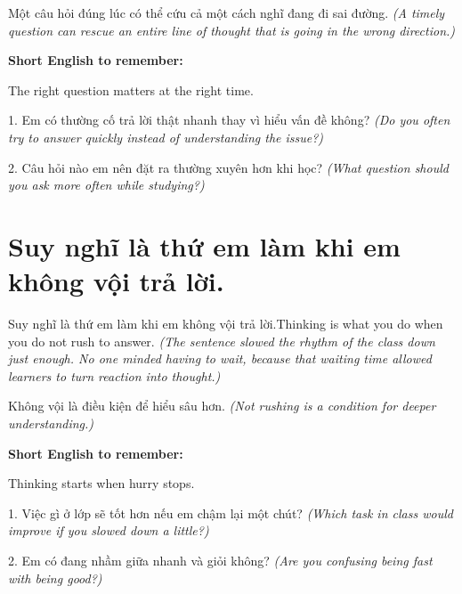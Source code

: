 \begin{baihoc}
Một câu hỏi đúng lúc có thể cứu cả một cách nghĩ đang đi sai đường.
\textit{(A timely question can rescue an entire line of thought that is going in the wrong direction.)}
\end{baihoc}

\begin{ghinhoanh}
\textbf{Short English to remember:}

The right question matters at the right time.

\end{ghinhoanh}

\begin{tuhocnhanh}
1. Em có thường cố trả lời thật nhanh thay vì hiểu vấn đề không? \textit{(Do you often try to answer quickly instead of understanding the issue?)}

2. Câu hỏi nào em nên đặt ra thường xuyên hơn khi học? \textit{(What question should you ask more often while studying?)}
\end{tuhocnhanh}
\ngancach


\section{Suy nghĩ là thứ em làm khi em không vội trả lời.}
\begin{truyen}{Suy nghĩ là thứ em làm khi em không vội trả lời.}{Thinking is what you do when you do not rush to answer.}
\textit{(The sentence slowed the rhythm of the class down just enough. No one minded having to wait, because that waiting time allowed learners to turn reaction into thought.)}
\end{truyen}

\begin{baihoc}
Không vội là điều kiện để hiểu sâu hơn.
\textit{(Not rushing is a condition for deeper understanding.)}
\end{baihoc}

\begin{ghinhoanh}
\textbf{Short English to remember:}

Thinking starts when hurry stops.

\end{ghinhoanh}

\begin{tuhocnhanh}
1. Việc gì ở lớp sẽ tốt hơn nếu em chậm lại một chút? \textit{(Which task in class would improve if you slowed down a little?)}

2. Em có đang nhầm giữa nhanh và giỏi không? \textit{(Are you confusing being fast with being good?)}
\end{tuhocnhanh}
\ngancach


